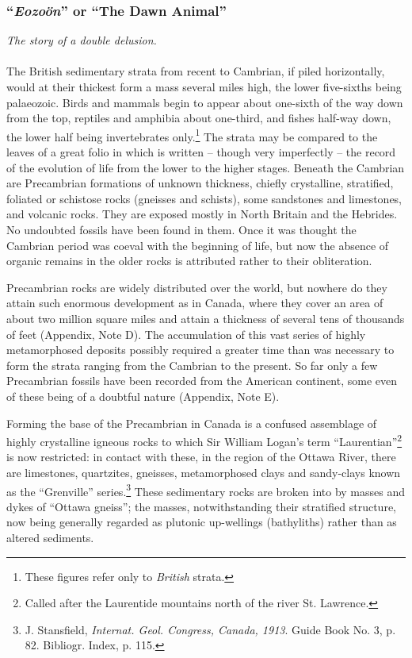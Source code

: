 \documentclass[a4paper, 12pt, oneside]{article}
\begin{document}
\subsubsection{``\emph{Eozoön}'' or ``The Dawn Animal''}
\centerline{\emph{The story of a double delusion.}}
\paragraph{}
The British sedimentary strata from recent to Cambrian, if piled horizontally, would at their thickest form a mass several miles high, the lower five-sixths being palaeozoic. Birds and mammals begin to appear about one-sixth of the way down from the top, reptiles and amphibia about one-third, and fishes half-way down, the lower half being invertebrates only.\footnote{These figures refer only to \emph{British} strata.} The strata may be compared to the leaves of a great folio in which is written -- though very imperfectly -- the record of the evolution of life from the lower to the higher stages. Beneath the Cambrian are Precambrian formations of unknown thickness, chiefly crystalline, stratified, foliated or schistose rocks (gneisses and schists), some sandstones and limestones, and volcanic rocks. They are exposed mostly in North Britain and the Hebrides. No undoubted fossils have been found in them. Once it was thought the Cambrian period was coeval with the beginning of life, but now the absence of organic remains in the older rocks is attributed rather to their obliteration.

Precambrian rocks are widely distributed over the world, but nowhere do they attain such enormous development as in Canada, where they cover an area of about two million square miles and attain a thickness of several tens of thousands of feet (Appendix, Note D). The accumulation of this vast series of highly metamorphosed deposits possibly required a greater time than was necessary to form the strata ranging from the Cambrian to the present. So far only a few Precambrian fossils have been recorded from the American continent, some even of these being of a doubtful nature (Appendix, Note E).

Forming the base of the Precambrian in Canada is a confused assemblage of highly crystalline igneous rocks to which Sir William Logan's term ``Laurentian''\footnote{Called after the Laurentide mountains north of the river St. Lawrence.} is now restricted: in contact with these, in the region of the Ottawa River, there are limestones, quartzites, gneisses, metamorphosed clays and sandy-clays known as the ``Grenville'' series.\footnote{J. Stansfield, \emph{Internat. Geol. Congress, Canada, 1913}. Guide Book No. 3, p. 82. Bibliogr. Index, p. 115.} These sedimentary rocks are broken into by masses and dykes of ``Ottawa gneiss''; the masses, notwithstanding their stratified structure, now being generally regarded as plutonic up-wellings (bathyliths) rather than as altered sediments.
\end{document}
